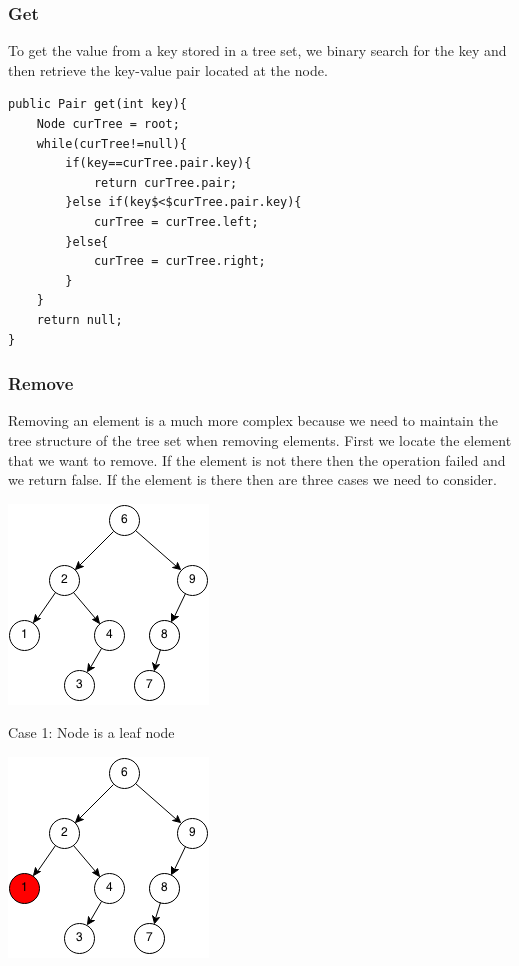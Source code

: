 \documentclass[11pt,oneside]{book}
\makeatletter
\def\maxwidth#1{\ifdim\Gin@nat@width>#1 #1\else\Gin@nat@width\fi}
\makeatother
\begin{document}
\subsubsection{Get}

To get the value from a key stored in a tree set, we binary search for the key and then retrieve the key-value pair located at the node.

\begin{lstlisting}
public Pair get(int key){
    Node curTree = root;
    while(curTree!=null){
        if(key==curTree.pair.key){
            return curTree.pair;
        }else if(key$<$curTree.pair.key){
            curTree = curTree.left;
        }else{
            curTree = curTree.right;
        }
    }
    return null;
}
\end{lstlisting}

\subsubsection{Remove}

Removing an element is a much more complex because we need to maintain the tree structure of the tree set when removing elements. First we locate the element that we want to remove. If the element is not there then the operation failed and we return false. If the element is there then are three cases we need to consider.

\includegraphics[width=\maxwidth{\textwidth}]{bst-rem.png}

Case 1: Node is a leaf node

\includegraphics[width=\maxwidth{\textwidth}]{bst-rem-case11.png}
\end{document}
